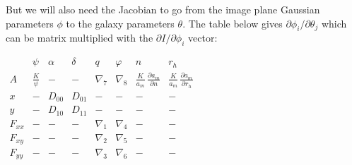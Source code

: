 \documentclass[modern]{aastex62}
\begin{document}
{But we will also need the Jacobian to go from the image plane Gaussian parameters $\phi$ to the galaxy parameters $\theta$.
The table below gives $\partial \phi_i / \partial \theta_j$ which can be matrix multiplied with the $\partial I / \partial \phi_i$ vector:

\begin{center}
$
\begin{array}{c|ccccccc}
 & \psi & \alpha & \delta & q & \varphi & n & r_h \\
\hline
A      &  \frac{K}{\psi} & -      & -      & \nabla_7 & \nabla_8 &  \frac{K}{a_m}\, \frac{\partial a_m}{\partial n} & \frac{K}{a_m} \,\frac{\partial a_m}{\partial r_h} \\
x      & -         & D_{00} & D_{01} & -        & -        & -               & - \\
y      & -         & D_{10} & D_{11} & -        & -        & -               & - \\
F_{xx} & -         & -      & -      & \nabla_1 & \nabla_4 & -               & - \\
F_{xy} & -         & -      & -      & \nabla_2 & \nabla_5 & -               & - \\
F_{yy} & -         & -      & -      & \nabla_3 & \nabla_6 & -               & - \\
\end{array}
$
\end{center}

}
\end{document}
